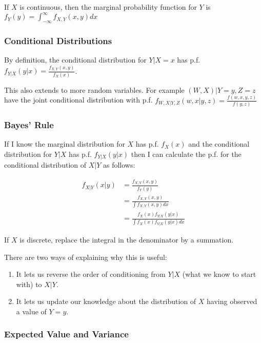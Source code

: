 \documentclass[]{article}
\begin{document}
If \(X\) is continuous, then the marginal probability function for \(Y\)
is \(f_Y(y) = \int_{-\infty}^{\infty} f_{X,Y}(x, y) dx\)

\subsubsection{Conditional
Distributions}\label{conditional-distributions}

By definition, the conditional distribution for \(Y | X = x\) has p.f.
\(f_{Y|X}(y | x) = \frac{f_{X,Y}(x,y)}{f_X(x)}\).

This also extends to more random variables. For example
\((W, X) | Y = y, Z = z\) have the joint conditional distribution with
p.f. \(f_{W,X|Y,Z}(w, x | y, z) = \frac{f(w, x, y, z)}{f(y, z)}\)

\subsubsection{Bayes' Rule}\label{bayes-rule}

If I know the marginal distribution for \(X\) has p.f. \(f_X(x)\) and
the conditional distribution for \(Y|X\) has p.f. \(f_{Y|X}(y|x)\) then
I can calculate the p.f. for the conditional distribution of \(X | Y\)
as follows:

\begin{align*}
f_{X|Y}(x | y) &= \frac{f_{X,Y}(x,y)}{f_Y(y)} \\
 &= \frac{f_{X,Y}(x, y)}{\int f_{X,Y}(x, y) dx} \\
 &= \frac{f_X(x)f_{Y|X}(y|x)}{\int f_X(x) f_{Y|X}(y|x) dx}
\end{align*}

If \(X\) is discrete, replace the integral in the denominator by a
summation.

There are two ways of explaining why this is useful:

\begin{enumerate}
\item It lets us reverse the order of conditioning from $Y|X$ (what we know to start with) to $X|Y$.
\item It lets us update our knowledge about the distribution of $X$ having observed a value of $Y = y$.
\end{enumerate}

\subsubsection{Expected Value and
Variance}\label{expected-value-and-variance}
\end{document}
